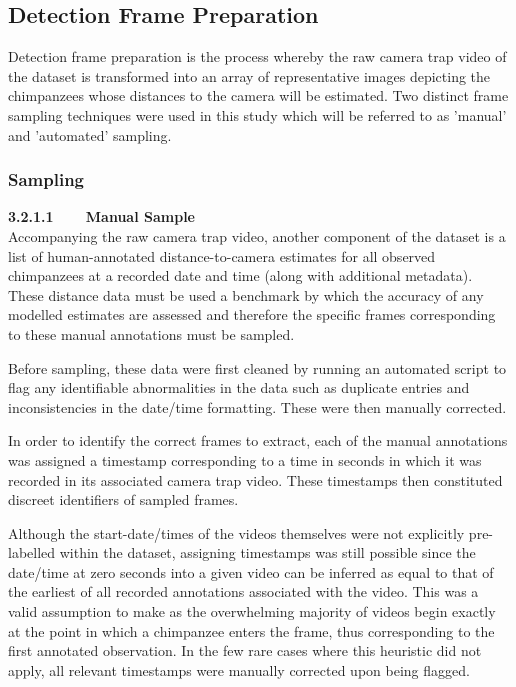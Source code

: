 \subsection{Detection Frame Preparation}

Detection frame preparation is the process whereby the raw camera trap video of the dataset
is transformed into an array of representative images depicting the chimpanzees whose
distances to the camera will be estimated.
Two distinct frame sampling techniques were used in this study which will be referred to as
'manual' and 'automated' sampling.

\vspace{-3mm}

\subsubsection{Sampling}

\textbf{3.2.1.1~~~~Manual Sample}\vspace{4.5mm}\\
Accompanying the raw camera trap video, another component of the dataset is a list of
human-annotated distance-to-camera estimates for all observed chimpanzees at a recorded
date and time (along with additional metadata).
These distance data must be used a benchmark by which the accuracy of any modelled estimates
are assessed and therefore the specific frames corresponding to these manual annotations must
be sampled.

Before sampling, these data were first cleaned by running an automated script to flag any
identifiable abnormalities in the data such as duplicate entries and inconsistencies in the
date/time formatting.
These were then manually corrected.

In order to identify the correct frames to extract, each of the manual annotations was assigned
a timestamp corresponding to a time in seconds in which it was recorded in its associated camera
trap video.
These timestamps then constituted discreet identifiers of sampled frames.

Although the start-date/times of the videos themselves were not explicitly pre-labelled within
the dataset, assigning timestamps was still possible since the date/time at zero seconds into
a given video can be inferred as equal to that of the earliest of all recorded annotations
associated with the video.
This was a valid assumption to make as the overwhelming majority of videos begin exactly at the
point in which a chimpanzee enters the frame, thus corresponding to the first annotated observation.
In the few rare cases where this heuristic did not apply, all relevant timestamps were manually
corrected upon being flagged.

